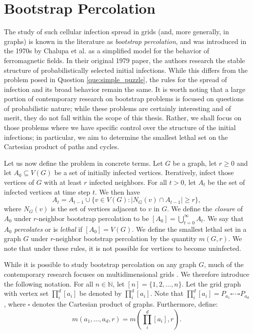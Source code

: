 \section{Bootstrap Percolation}

The study of such cellular infection spread in grids (and, more generally, in graphs) is known in the literature as \emph{bootstrap percolation}, and was introduced in the 1970s by Chalupa et al. \cite{chalupa:1979} as a simplified model for the behavior of ferromagnetic fields. In their original 1979 paper, the authors research the stable structure of probabilistically selected initial infections. While this differs from the problem posed in Question \ref{que:simple_puzzle}, the rules for the spread of infection and its broad behavior remain the same. It is worth noting that a large portion of contemporary research on bootstrap problems is focused on questions of probabilistic nature; while these problems are certainly interesting and of merit, they do not fall within the scope of this thesis. Rather, we shall focus on those problems where we have specific control over the structure of the initial infections; in particular, we aim to determine the smallest lethal set on the Cartesian product of paths and cycles. 

Let us now define the problem in concrete terms. Let $G$ be a graph, let $r \geq 0$ and let $A_0 \subseteq V(G)$ be a set of initially infected vertices. Iteratively, infect those vertices of $G$ with at least $r$ infected neighbors. For all $t > 0$, let $A_t$ be the set of infected vertices at time step $t$. We then have
$$A_t = A_{t-1} \cup \{v \in V(G) : |N_G(v) \cap A_{t-1}| \geq r\},$$
where $N_G(v)$ is the set of vertices adjacent to $v$ in $G$. We define the \emph{closure} of $A_0$ under $r$-neighbor bootstrap percolation to be $[A_0] = \bigcup_{t=0}^{\infty} A_t$. We say that $A_0$ \emph{percolates} or is \emph{lethal} if $[A_0] = V(G)$. We define the smallest lethal set in a graph $G$ under $r$-neighbor bootstrap percolation by the quantity $m(G,r)$. We note that under these rules, it is not possible for vertices to become uninfected.

While it is possible to study bootstrap percolation on any graph $G$, much of the contemporary research focuses on multidimensional grids \cite{something}. We therefore introduce the following notation. For all $n \in \mathbb{N}$, let $[n] = \{1, 2, \dots, n\}$. Let the grid graph with vertex set $\prod_i^d [a_i]$ be denoted by $\prod_i^d [a_i]$. Note that $\prod_i^d [a_i] = P_{a_1} \square \cdots \square P_{a_d}$, where $\square$ denotes the Cartesian product of graphs. Furthermore, define:
$$m(a_1, \dots, a_d, r) = m\left(\prod_i^d [a_i], r\right).$$

